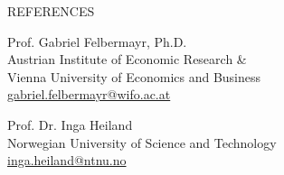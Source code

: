 \documentclass{article}
\begin{document}
\begin{minipage}[t]{0.12\textwidth}
    {\selectfont REFERENCES} \\
\end{minipage}
\hspace{5mm}
\begin{minipage}[t]{0.4\textwidth}
    Prof. Gabriel Felbermayr, Ph.D. \\
    Austrian Institute of Economic Research \& \\
    Vienna University of Economics and Business \\
\href{mailto:gabriel.felbermayr@wifo.ac.at}{gabriel.felbermayr@wifo.ac.at}
\end{minipage}
\hspace{5mm}
\begin{minipage}[t]{0.4\textwidth}
    Prof. Dr. Inga Heiland \\
    Norwegian University of Science and Technology \\
\href{mailto:inga.heiland@ntnu.no}{inga.heiland@ntnu.no}
\end{minipage}
\bigskip
\bigskip

\end{document}
